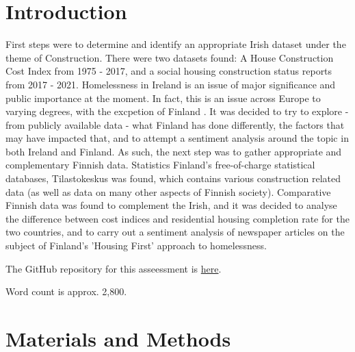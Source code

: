 \documentclass[hidelinks,12pt,oneside]{report} %
\begin{document}
\chapter{Introduction}
First steps were to determine and identify an appropriate Irish dataset under the theme of Construction.
There were two datasets found: A House Construction Cost Index from 1975 - 2017, and a social housing construction status reports from 2017 - 2021. Homelessness in Ireland is an issue of major significance and public importance at the moment. In fact, this is an issue across Europe to varying
degrees, with the excpetion of Finland \citep{Ecoscope}. It was decided to try to explore - from publicly available
data - what Finland has done differently, the factors that may have impacted that, and to attempt a sentiment analysis around the topic in both Ireland and Finland. As such, the next step was to gather appropriate and complementary Finnish data. Statistics Finland’s free-of-charge statistical databases, Tilastokeskus was found, which contains various construction related data (as well as data on many other aspects of Finnish society). Comparative Finnish data was found to complement the Irish, and it was decided to analyse the difference between cost indices and residential housing completion rate for the two countries, and to carry out a sentiment analysis of newspaper articles on the subject of Finland's 'Housing First' approach to homelessness.

The GitHub repository for this asseessment is
\href{https://github.com/coharaCNJ/CCT_MSc_ContinuousAssessment2.git}{here}.

Word count is approx. 2,800.

\chapter{Materials and Methods}
\end{document}
